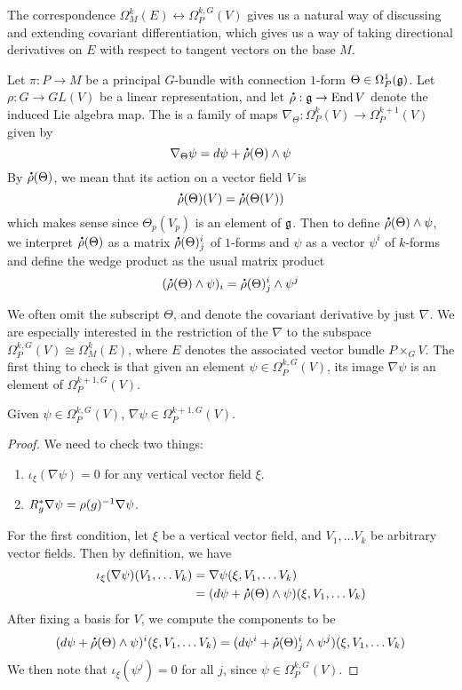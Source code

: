 The correspondence $\Omega^k_M(E) \leftrightarrow \Omega^{k,G}_P(V)$ gives
us a natural way of discussing and extending covariant differentiation, which
gives us a way of taking directional derivatives on $E$ with respect to tangent
vectors on the base $M$.
\begin{defn}
Let $\pi : P \to M$ be a principal $G$-bundle with connection $1$-form
$\Theta \in \Omega_P^1(\mathfrak{g})$. Let $\rho : G \to GL(V)$ be a linear representation,
and let $\accentset{\mbox{\large\bfseries .}}{\rho} : \mathfrak{g} \to \operatorname{End} V$ denote the induced Lie algebra map. The
 is a family of maps
$\nabla_\Theta : \Omega_P^k(V) \to \Omega_P^{k+1}(V)$ given by
\[
\nabla_\Theta \psi = d\psi + \accentset{\mbox{\large\bfseries .}}{\rho}(\Theta) \wedge \psi
\]
By $\accentset{\mbox{\large\bfseries .}}{\rho}(\Theta)$, we mean that its action on a vector field $V$ is
\[
\accentset{\mbox{\large\bfseries .}}{\rho}(\Theta)(V) = \accentset{\mbox{\large\bfseries .}}{\rho}(\Theta(V))
\]
which makes sense since $\Theta_p(V_p)$ is an element of $\mathfrak{g}$. Then
to define $\accentset{\mbox{\large\bfseries .}}{\rho}(\Theta) \wedge \psi$, we interpret $\accentset{\mbox{\large\bfseries .}}{\rho}(\Theta)$
as a matrix $\accentset{\mbox{\large\bfseries .}}{\rho}(\Theta)^i_j$ of $1$-forms and $\psi$ as a vector
$\psi^i$ of $k$-forms and define the wedge product as the usual matrix product
\[
(\accentset{\mbox{\large\bfseries .}}{\rho}(\Theta) \wedge \psi)_i = \accentset{\mbox{\large\bfseries .}}{\rho}(\Theta)^i_j \wedge \psi^j
\]
\end{defn}
%
We often omit the subscript $\Theta$, and denote the covariant derivative by
just $\nabla$. We are especially interested in the restriction of the $\nabla$
to the subspace $\Omega_P^{k,G}(V) \cong \Omega_M^k(E)$, where $E$ denotes
the associated vector bundle $P \times_G V$. The first thing to check
is that given an element $\psi \in \Omega_P^{k,G}(V)$, its image
$\nabla\psi$ is an element of $\Omega_P^{k+1,G}(V)$.
%
\begin{prop}
Given $\psi \in \Omega_P^{k,G}(V)$, $\nabla\psi \in \Omega_P^{k+1,G}(V)$.
\end{prop}
%
\begin{proof} %
We need to check two things:
\begin{enumerate}
  \item $\iota_{\xi}(\nabla\psi) = 0$ for any vertical vector field $\xi$.
  \item $R_g^*\nabla\psi = \rho(g)^{-1} \nabla\psi$.
\end{enumerate}
For the first condition, let $\xi$ be a vertical vector field, and
$V_1, \ldots V_k$ be arbitrary vector fields. Then by definition, we have
\begin{align*}
\iota_{\xi}(\nabla\psi)(V_1, \ldots V_k) &= \nabla\psi(\xi, V_1, \ldots V_k) \\
&= (d\psi + \accentset{\mbox{\large\bfseries .}}{\rho}(\Theta) \wedge \psi)(\xi, V_1, \ldots V_k)
\end{align*}
After fixing a basis for $V$, we compute the components to be
\[
(d\psi + \accentset{\mbox{\large\bfseries .}}{\rho}(\Theta) \wedge \psi)^i(\xi, V_1, \ldots V_k) =
(d\psi^i + \accentset{\mbox{\large\bfseries .}}{\rho}(\Theta)^i_j \wedge \psi^j)(\xi, V_1, \ldots V_k) \\
\]
We then note that $\iota_\xi(\psi^j) = 0$ for all $j$, since
$\psi \in \Omega_P^{k,G}(V)$.
\end{proof}

